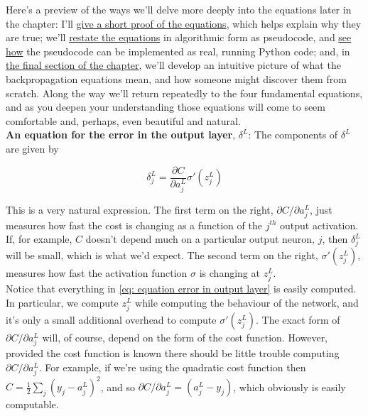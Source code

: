 Here's a preview of the ways we'll delve more deeply into the equations later in the chapter: I'll \hyperref[sec: Proof of the four fundamental equations (optional)]{give a short proof of the equations}, which helps explain why they are true; we'll \hyperref[sec: The backpropagation algorithm]{restate the equations} in algorithmic form as pseudocode, and \hyperref[sec: The code for backpropagation]{see how} the pseudocode can be implemented as real, running Python code; and, in \hyperref[sec: Backpropagation: the big picture]{the final section of the chapter}, we'll develop an intuitive picture of what the backpropagation equations mean, and how someone might discover them from scratch. Along the way we'll return repeatedly to the four fundamental equations, and as you deepen your understanding those equations will come to seem comfortable and, perhaps, even beautiful and natural.\\

\textbf{An equation for the error in the output layer}, $\delta^L$: The components of $\delta^L$ are given by

\begin{equation}
\delta^L_j=\frac{\partial C}{\partial a^L_j}\sigma'(z^L_j)
\tag{BP1}
\label{eq: equation error in output layer}
\end{equation}

This is a very natural expression. The first term on the right, $\partial C/\partial a^L_{j}$, just measures how fast the cost is changing as a function of the $j^{th}$ output activation. If, for example, $C$ doesn't depend much on a particular output neuron, $j$, then $\delta^L_j$ will be small, which is what we'd expect. The second term on the right, $\sigma'(z^L_j)$, measures how fast the activation function $\sigma$ is changing at $z^L_j$.\\

Notice that everything in \ref{eq: equation error in output layer} is easily computed. In particular, we compute $z^L_j$ while computing the behaviour of the network, and it's only a small additional overhead to compute $\sigma'(z^L_j)$. The exact form of $\partial C/\partial a^L_{j}$ will, of course, depend on the form of the cost function. However, provided the cost function is known there should be little trouble computing $\partial C/\partial a^L_{j}$. For example, if we're using the quadratic cost function then $C=\frac{1}{2}\sum_j(y_j-a^L_j)^2$, and so $\partial C/\partial a^L_{j}=(a^L_j-y_j)$, which obviously is easily computable.\\

